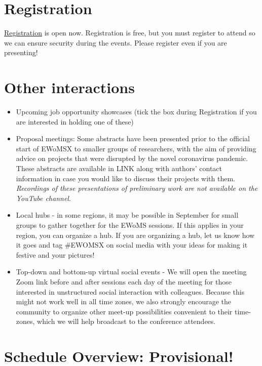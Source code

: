 \documentclass[12pt,]{book}
\begin{document}
\hypertarget{registration}{%
\section{Registration}\label{registration}}

\href{https://cardiffunipsych.eu.qualtrics.com/jfe/form/SV_0VYX845gbq54Arr}{Registration} is open now. Registration is free, but you must register to attend so we can ensure security during the events. Please register even if you are presenting!

\hypertarget{other-interactions}{%
\section{Other interactions}\label{other-interactions}}

\begin{itemize}
\item
  Upcoming job opportunity showcases (tick the box during Registration if you are interested in holding one of these)
\item
  Proposal meetings: Some abstracts have been presented prior to the official start of EWoMSX to smaller groups of researchers, with the aim of providing advice on projects that were disrupted by the novel coronavirus pandemic. These abstracts are available in LINK along with authors' contact information in case you would like to discuss their projects with them. \emph{Recordings of these presentations of preliminary work are not available on the YouTube channel}.
\item
  Local hubs - in some regions, it may be possible in September for small groups to gather together for the EWoMS sessions. If this applies in your region, you can organize a hub. If you are organizing a hub, let us know how it goes and tag \#EWOMSX on social media with your ideas for making it festive and your pictures!
\item
  Top-down and bottom-up virtual social events - We will open the meeting Zoom link before and after sessions each day of the meeting for those interested in unstructured social interaction with colleagues. Because this might not work well in all time zones, we also strongly encourage the community to organize other meet-up possibilities convenient to their time-zones, which we will help broadcast to the conference attendees.
\end{itemize}

\hypertarget{schedule-overview-provisional}{%
\section{Schedule Overview: Provisional!}\label{schedule-overview-provisional}}
\end{document}
